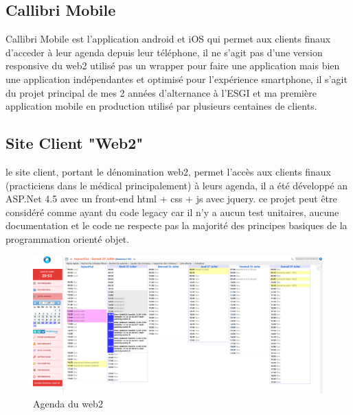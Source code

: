 \subsection{Callibri Mobile}
Callibri Mobile est l'application android et iOS qui permet aux clients finaux 
d'acceder à leur agenda depuis leur téléphone, il ne s'agit pas d'une version 
responsive du web2 utilisé pas un wrapper pour faire une application mais bien
une application indépendantes et optimisé pour l'expérience smartphone,
il s'agit du projet principal de mes 2 années d'alternance à l'ESGI et ma première 
application mobile en production utilisé par plusieurs centaines de clients.

\subsection{Site Client "Web2"}
le site client, portant le dénomination web2, permet l'accès aux 
clients finaux (practiciens dans le médical principalement) à leurs agenda,
il a été développé an ASP.Net 4.5 avec un front-end html + css + js avec jquery.
ce projet peut être considéré comme ayant du code legacy car il n'y a aucun 
test unitaires, aucune documentation et le code ne respecte pas la majorité
des principes basiques de la programmation orienté objet. 
\newline

\begin{figure}[!h]
    \centering
    \includegraphics[width=1\linewidth]{Images/web2agenda}
    \caption{Agenda du web2}
    \label{fig:archhexa}
\end{figure}


